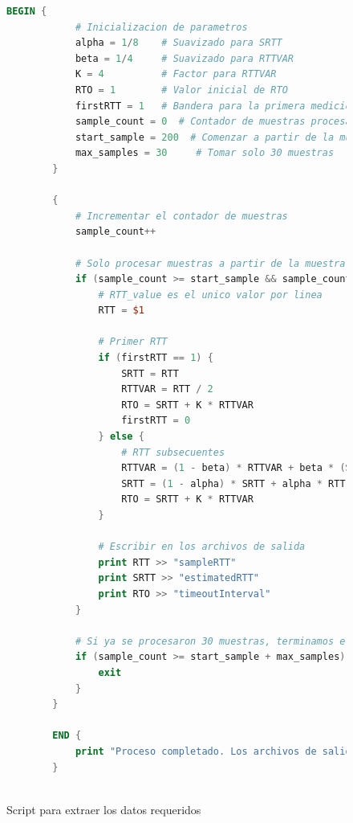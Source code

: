 \begin{figure}[H]
    \centering
    \begin{lstlisting}[frame=single, breaklines=true, basicstyle=\footnotesize\ttfamily, breakatwhitespace=false, 
        columns=flexible, tabsize=2, showstringspaces=false, language=AWK] 
        BEGIN {
            # Inicializacion de parametros
            alpha = 1/8    # Suavizado para SRTT
            beta = 1/4     # Suavizado para RTTVAR
            K = 4          # Factor para RTTVAR
            RTO = 1        # Valor inicial de RTO
            firstRTT = 1   # Bandera para la primera medicion RTT
            sample_count = 0  # Contador de muestras procesadas
            start_sample = 200  # Comenzar a partir de la muestra 200
            max_samples = 30     # Tomar solo 30 muestras
        }
        
        {
            # Incrementar el contador de muestras
            sample_count++
        
            # Solo procesar muestras a partir de la muestra 200
            if (sample_count >= start_sample && sample_count < start_sample + max_samples) {
                # RTT_value es el unico valor por linea
                RTT = $1
        
                # Primer RTT
                if (firstRTT == 1) {
                    SRTT = RTT
                    RTTVAR = RTT / 2
                    RTO = SRTT + K * RTTVAR
                    firstRTT = 0
                } else {
                    # RTT subsecuentes
                    RTTVAR = (1 - beta) * RTTVAR + beta * (SRTT > RTT ? SRTT - RTT : RTT - SRTT)
                    SRTT = (1 - alpha) * SRTT + alpha * RTT
                    RTO = SRTT + K * RTTVAR
                }
        
                # Escribir en los archivos de salida
                print RTT >> "sampleRTT"
                print SRTT >> "estimatedRTT"
                print RTO >> "timeoutInterval"
            }
        
            # Si ya se procesaron 30 muestras, terminamos el script
            if (sample_count >= start_sample + max_samples) {
                exit
            }
        }
        
        END {
            print "Proceso completado. Los archivos de salida son: sampleRTT, EstimatedRTT, TimeoutInterval."
        }
        
    \end{lstlisting}
    \caption{Script para extraer los datos requeridos}
    \label{fig:scriptAWK}
\end{figure}

